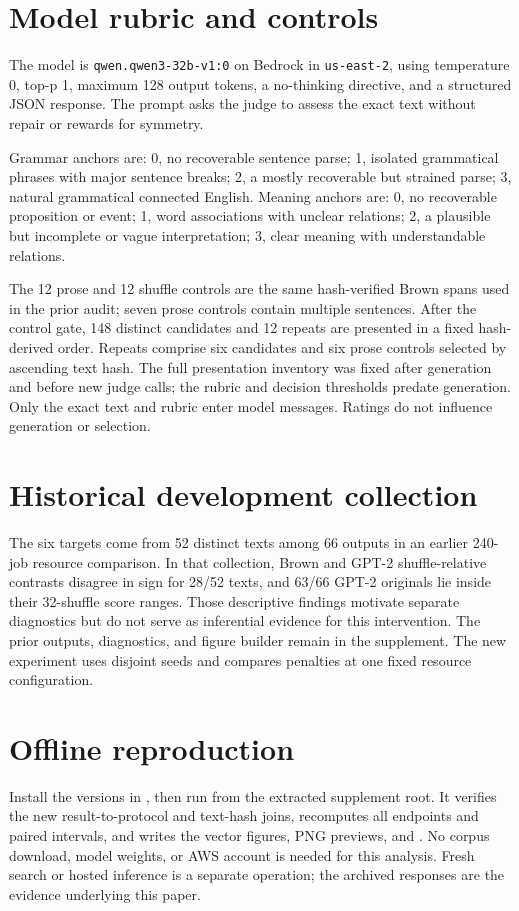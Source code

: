 \documentclass[11pt]{article}
\newcommand{\code}[1]{\texttt{#1}}
\begin{document}
\section{Model rubric and controls}\label{sec:rubric}
The model is \code{qwen.qwen3-32b-v1:0} on Bedrock in \code{us-east-2}, using temperature 0, top-p 1, maximum 128 output tokens, a no-thinking directive, and a structured JSON response. The prompt asks the judge to assess the exact text without repair or rewards for symmetry.

Grammar anchors are: 0, no recoverable sentence parse; 1, isolated grammatical phrases with major sentence breaks; 2, a mostly recoverable but strained parse; 3, natural grammatical connected English. Meaning anchors are: 0, no recoverable proposition or event; 1, word associations with unclear relations; 2, a plausible but incomplete or vague interpretation; 3, clear meaning with understandable relations.

The 12 prose and 12 shuffle controls are the same hash-verified Brown spans used in the prior audit; seven prose controls contain multiple sentences. After the control gate, 148 distinct candidates and 12 repeats are presented in a fixed hash-derived order. Repeats comprise six candidates and six prose controls selected by ascending text hash. The full presentation inventory was fixed after generation and before new judge calls; the rubric and decision thresholds predate generation. Only the exact text and rubric enter model messages. Ratings do not influence generation or selection.

\section{Historical development collection}
The six targets come from 52 distinct texts among 66 outputs in an earlier 240-job resource comparison. In that collection, Brown and GPT-2 shuffle-relative contrasts disagree in sign for 28/52 texts, and 63/66 GPT-2 originals lie inside their 32-shuffle score ranges. Those descriptive findings motivate separate diagnostics but do not serve as inferential evidence for this intervention. The prior outputs, diagnostics, and figure builder remain in the supplement. The new experiment uses disjoint seeds and compares penalties at one fixed resource configuration.

\section{Offline reproduction}
Install the versions in , then run  from the extracted supplement root. It verifies the new result-to-protocol and text-hash joins, recomputes all endpoints and paired intervals, and writes the vector figures, PNG previews, and . No corpus download, model weights, or AWS account is needed for this analysis. Fresh search or hosted inference is a separate operation; the archived responses are the evidence underlying this paper.
\end{document}
